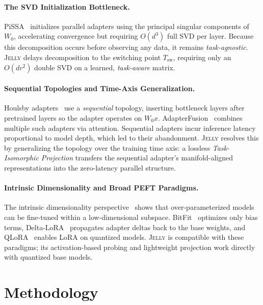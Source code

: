 \documentclass{article}
\newcommand{\Wbase}{W_0}
\newcommand{\Tswitch}{T_{\mathrm{sw}}}
\newcommand{\jelly}{\textsc{Jelly}}
\begin{document}
\paragraph{The SVD Initialization Bottleneck.}
PiSSA~\citep{meng2024pissa} initializes parallel adapters using the principal singular components of $\Wbase$, accelerating convergence but requiring $O(d^3)$ full SVD per layer.
Because this decomposition occurs before observing any data, it remains \emph{task-agnostic}.
\jelly{} delays decomposition to the switching point $\Tswitch$, requiring only an $O(dr^2)$ double SVD on a learned, \emph{task-aware} matrix.

\paragraph{Sequential Topologies and Time-Axis Generalization.}
Houlsby adapters~\citep{houlsby2019parameter} use a \emph{sequential} topology, inserting bottleneck layers after pretrained layers so the adapter operates on $\Wbase x$. AdapterFusion~\citep{pfeiffer2020adapterfusion} combines multiple such adapters via attention.
Sequential adapters incur inference latency proportional to model depth, which led to their abandonment.
\jelly{} resolves this by generalizing the topology over the training time axis: a lossless \emph{Task-Isomorphic Projection} transfers the sequential adapter's manifold-aligned representations into the zero-latency parallel structure.

\paragraph{Intrinsic Dimensionality and Broad PEFT Paradigms.}
The intrinsic dimensionality perspective~\citep{aghajanyan2021intrinsic} shows that over-parameterized models can be fine-tuned within a low-dimensional subspace.
BitFit~\citep{zaken2022bitfit} optimizes only bias terms, Delta-LoRA~\citep{zi2023delta} propagates adapter deltas back to the base weights, and QLoRA~\citep{dettmers2023qlora} enables LoRA on quantized models.
\jelly{} is compatible with these paradigms; its activation-based probing and lightweight projection work directly with quantized base models.

\section{Methodology}
\label{sec:method}
\end{document}
